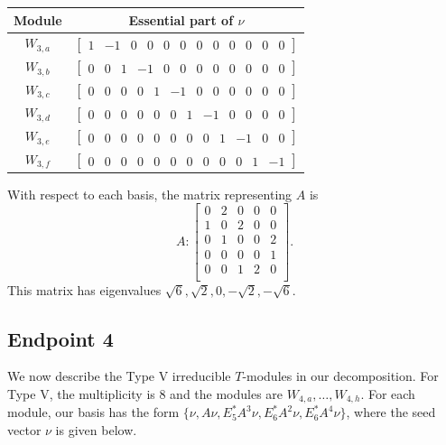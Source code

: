 \documentclass[12pt,letterpaper]{article}
\newcommand{\rowvector}[1]{\begin{bmatrix} #1 \end{bmatrix}}
\begin{document}
\begin{center}
    \begin{tabular}{c | c}
    \toprule
       \textbf{Module}  & \textbf{Essential part of }$\nu$ \\
       \midrule
       $W_{3,a}$  & $\rowvector{1 & -1 & 0 & 0 & 0 & 0 & 0 & 0 & 0 & 0 & 0 & 0}$ \\[1.67pt]
       $W_{3,b}$  & $\rowvector{0 & 0 & 1 & -1 & 0 & 0 & 0 & 0 & 0 & 0 & 0 & 0}$ \\[1.67pt]
       $W_{3,c}$  & $\rowvector{0 & 0 & 0 & 0 & 1 & -1 & 0 & 0 & 0 & 0 & 0 & 0}$ \\[1.67pt]
       $W_{3,d}$  & $\rowvector{0 & 0 & 0 & 0 & 0 & 0 & 1 & -1 & 0 & 0 & 0 & 0}$ \\[1.67pt]
       $W_{3,e}$  & $\rowvector{0 & 0 & 0 & 0 & 0 & 0 & 0 & 0 & 1 & -1 & 0 & 0}$ \\[1.67pt]
       $W_{3,f}$  & $\rowvector{0 & 0 & 0 & 0 & 0 & 0 & 0 & 0 & 0 & 0 & 1 & -1}$ \\
    \bottomrule
    \end{tabular}
\end{center}

With respect to each basis, the matrix representing $A$ is 
\begin{equation}
    A: \begin{bmatrix}
  0 & 2 & 0 & 0 & 0 \\
  1 & 0 & 2 & 0 & 0 \\
  0 & 1 & 0 & 0 & 2 \\
  0 & 0 & 0 & 0 & 1 \\
  0 & 0 & 1 & 2 & 0 \\
\end{bmatrix}.
\label{eq:t12v2-IV}
\end{equation}
This matrix has eigenvalues $\sqrt{6}, \sqrt{2}, 0, -\sqrt{2}, -\sqrt{6}$.

\subsection{Endpoint 4}

We now describe the Type V irreducible $T$-modules in our decomposition.
For Type V, the multiplicity is 8 and the modules are $W_{4,a}, \dots, W_{4,h}$.
For each module, our basis has the form $\{\nu, A\nu, E_5^*A^3\nu, E_6^*A^2\nu, E_6^*A^4\nu\}$, where the seed vector $\nu$ is given below.
\end{document}
